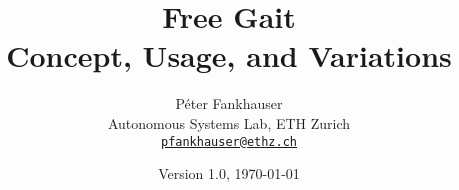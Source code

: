 \title{{\bf Free Gait} \\ Concept, Usage, and Variations}

\author{P\'eter Fankhauser \\ Autonomous Systems Lab, ETH Zurich \\\href{mailto:pfankhauser@ethz.ch}{\nolinkurl{pfankhauser@ethz.ch}}}
\date{Version 1.0, \today}

\maketitle